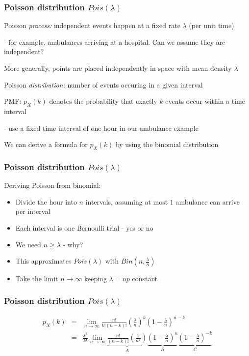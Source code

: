 \documentclass[t,8pt]{beamer}%
\begin{document}
	\begin{frame}
		\frametitle{Poisson distribution $Pois(\lambda)$}
		Poisson {\it process:} independent events happen at a fixed rate $\lambda$ (per unit time) \par
		{\small\color{NavyBlue} - for example, ambulances arriving at a hospital. Can we assume they are independent?} \par
		More generally, points are placed independently in space with mean density $\lambda$ \par
		Poisson {\it distribution:} number of events occuring in a given interval \par
		PMF: $p_X(k)$ denotes the probability that exactly $k$ events occur within a time interval \par
		{\small\color{NavyBlue} - use a fixed time interval of one hour in our ambulance example} \par
		We can derive a formula for $p_X(k)$ by using the binomial distribution
	\end{frame}
	
	\begin{frame}
		\frametitle{Poisson distribution $Pois(\lambda)$}
		Deriving Poisson from binomial:
		\begin{itemize}
			\item Divide the hour into $n$ intervals, assuming at most $1$ ambulance can arrive per interval
			\item Each interval is one Bernoulli trial - yes or no
			\item We need $n\geq\lambda$ - why?
			\item This approximates $Pois(\lambda)$ with $Bin(n,\frac{\lambda}n)$
			\item Take the limit $n\rightarrow\infty$ keeping $\lambda=np$ constant
		\end{itemize}
	\end{frame}
	
	\begin{frame}
		\frametitle{Poisson distribution $Pois(\lambda)$}
		\begin{eqnarray*}
			p_X(k)%
			&=&\lim_{n\rightarrow\infty}\frac{n!}{k!(n-k)!}\left(\frac{\lambda}n\right)^k\left(1-\frac{\lambda}n\right)^{n-k}\\
			&=&\frac{\lambda^k}{k!}\lim_{n\rightarrow\infty}\underbrace{\frac{n!}{(n-k)!}\left(\frac 1{n^k}\right)}_A\underbrace{\left(1-\frac{\lambda}n\right)^n}_B\underbrace{\left(1-\frac{\lambda}n\right)^{-k}}_C
		\end{eqnarray*}
	\end{frame}
	
\end{document}
